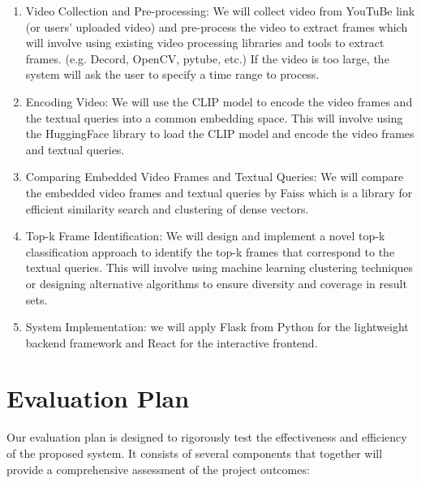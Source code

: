 \documentclass[11pt]{article}
\begin{document}
\begin{enumerate}
    \item Video Collection and Pre-processing: We will collect video from YouTuBe link (or users’ uploaded video) 
    and pre-process the video to extract frames which will involve using existing video processing libraries and tools to extract frames. (e.g. Decord, OpenCV, pytube, etc.) If the video is too large, the system will ask the user to specify a time range to process.
    
    \item Encoding Video: We will use the CLIP model to encode the video frames and the textual queries into a common embedding space. This will involve using the HuggingFace library to load the CLIP model and encode the video frames and textual queries. 
    
    \item Comparing Embedded Video Frames and Textual Queries: We will compare the embedded video frames and textual queries by Faiss which is a library for efficient similarity search and clustering of dense vectors. 
    
    \item Top-k Frame Identification: We will design and implement a novel top-k classification approach to identify the top-k frames that correspond to the textual queries. This will involve using machine learning clustering techniques or designing alternative algorithms to ensure diversity and coverage in result sets.
    
    \item System Implementation: we will apply Flask from Python for the lightweight backend framework and React for the interactive frontend. 


\end{enumerate}

\section{Evaluation Plan}

Our evaluation plan is designed to rigorously test the effectiveness and efficiency of the proposed system. 
It consists of several components that together will provide a comprehensive assessment of the project outcomes:
\end{document}
